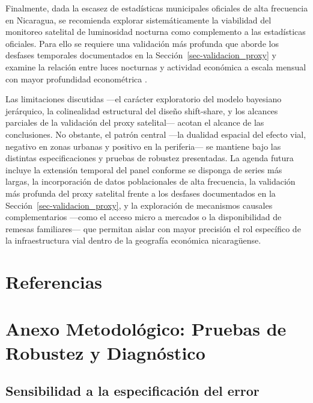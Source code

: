 \documentclass[
  spanish,
  12pt,
  letterpaper]{article}
\newcounter{none} %
\begin{document}
Finalmente, dada la escasez de estadísticas municipales oficiales de
alta frecuencia en Nicaragua, se recomienda explorar sistemáticamente la
viabilidad del monitoreo satelital de luminosidad nocturna como
complemento a las estadísticas oficiales. Para ello se requiere una
validación más profunda que aborde los desfases temporales documentados
en la Sección~\ref{sec-validacion_proxy} y examine la relación entre
luces nocturnas y actividad económica a escala mensual con mayor
profundidad econométrica \parencite{donaldson2016view}.

Las limitaciones discutidas ---el carácter exploratorio del modelo
bayesiano jerárquico, la colinealidad estructural del diseño
shift-share, y los alcances parciales de la validación del proxy
satelital--- acotan el alcance de las conclusiones. No obstante, el
patrón central ---la dualidad espacial del efecto vial, negativo en
zonas urbanas y positivo en la periferia--- se mantiene bajo las
distintas especificaciones y pruebas de robustez presentadas. La agenda
futura incluye la extensión temporal del panel conforme se disponga de
series más largas, la incorporación de datos poblacionales de alta
frecuencia, la validación más profunda del proxy satelital frente a los
desfases documentados en la Sección~\ref{sec-validacion_proxy}, y la
exploración de mecanismos causales complementarios ---como el acceso
micro a mercados o la disponibilidad de remesas familiares--- que
permitan aislar con mayor precisión el rol específico de la
infraestructura vial dentro de la geografía económica nicaragüense.

\newpage

\section*{Referencias}\label{referencias}

\printbibliography[heading=none]

\newpage

\appendix
\setcounter{table}{0}
\renewcommand{\thetable}{A.\arabic{table}}
\setcounter{figure}{0}
\renewcommand{\thefigure}{A.\arabic{figure}}
\section{Anexo Metodológico: Pruebas de Robustez y Diagnóstico}\label{sec:anexo_metodologico}

\subsection{Sensibilidad a la especificación del error}
\end{document}
